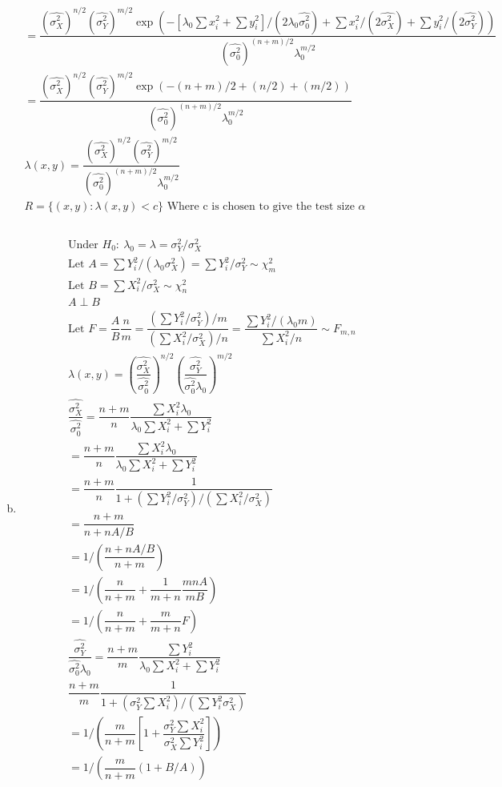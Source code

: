 \documentclass{article}
\newcommand{\lm}{\lambda}
\newcommand{\sg}{\sigma}
\newcommand{\al}{\alpha}
\newcommand{\sx}{\sg_X^2}
\newcommand{\sy}{\sg_Y^2}
\newcommand{\so}{\sg_0^2}
\newcommand{\lo}{\lm_0}
\begin{document}
\begin{flushleft}
\begin{enumerate}[(a)]
\begin{multline*}
=\dfrac{( \hat{\sx})^{n/2}( \hat{\sy})^{m/2}\exp\left(-\left[\lo\sum x_i^2+\sum y_i^2\right]/(2\lo \hat{\so})+\sum x_i^2/(2\hat{\sx})+\sum y_i^2/(2\hat{\sy}) \right)}{(\hat{\so})^{(n+m)/2}\lo^{m/2}}\\
=\dfrac{( \hat{\sx})^{n/2}( \hat{\sy})^{m/2}\exp\left(-(n+m)/2+(n/2)+(m/2) \right)}{(\hat{\so})^{(n+m)/2}\lo^{m/2}}\\
\lm(x,y)=\dfrac{( \hat{\sx})^{n/2}( \hat{\sy})^{m/2}}{(\hat{\so})^{(n+m)/2}\lo^{m/2}}\\
R=\{(x,y):\lm(x,y)<c \} \text{ Where c is chosen to give the test size } \al\\
\end{multline*}

	\item 
\begin{multline*}\\
\text{Under } H_0: \ \lo=\lm=\sy/\sx\\
\text{Let } A=\sum Y_i^2/(\lo\sx)=\sum Y_i^2/\sy \sim \chi^2_m\\
\text{Let } B=\sum X_i^2/\sx\sim \chi^2_n\\
A\perp B\\
\text{Let } F=\dfrac{A}{B}\dfrac{n}{m}=\dfrac{(\sum Y_i^2/\sy)/m}{(\sum X_i^2/\sx)/ n}=\dfrac{\sum Y_i^2/(\lo m)}{\sum X_i^2/n}\sim F_{m,n}\\
\lm(x,y)=\left( \dfrac{\hat{\sx}}{\hat{\so}}\right)^{n/2}\left( \dfrac{\hat{\sy}}{\hat{\so} \lo}\right)^{m/2} \\
 \dfrac{\hat{\sx}}{\hat{\so}}=\dfrac{n+m}{n}\dfrac{\sum X_i^2 \lo}{\lo \sum X_i^2+\sum Y_i^2}\\
=\dfrac{n+m}{n}\dfrac{\sum X_i^2 \lo}{\lo \sum X_i^2+\sum Y_i^2}\\
=\dfrac{n+m}{n}\dfrac{1}{1+(\sum Y_i^2/ \sy)/(\sum X_i^2/\sx)}\\
=\dfrac{n+m}{n+nA/B}\\
=1/\left(\dfrac{n+nA/B}{n+m}\right)\\
=1/\left(\dfrac{n}{n+m}+\dfrac{1}{m+n}\dfrac{mnA}{mB}\right)\\
=1/\left(\dfrac{n}{n+m}+\dfrac{m}{m+n}F\right)\\
\dfrac{\hat{\sy}}{\hat{\so} \lo}=\dfrac{n+m}{m}\dfrac{\sum Y_i^2}{\lo \sum X_i^2+\sum Y_i^2}\\
\dfrac{n+m}{m}\dfrac{1}{1+(\sy \sum X_i^2)/(\sum Y_i^2\sx)}\\
=1/\left(\dfrac{m}{n+m}\left[1+\dfrac{\sy \sum X_i^2}{\sx \sum Y_i^2}\right]\right)\\
=1/\left(\dfrac{m}{n+m}(1+B/A)\right)\\

\end{multline*}
\end{enumerate}
\end{flushleft}
\end{document}
